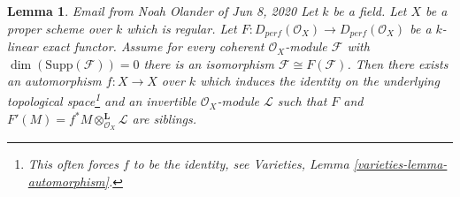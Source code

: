 \documentclass{stacks-project}
\newenvironment{reference}{\comment}{\endcomment}
\theoremstyle{plain}
\newtheorem{lemma}[subsection]{Lemma}
\theoremstyle{definition}
\theoremstyle{remark}
\numberwithin{equation}{subsection}
\begin{document}
\begin{lemma}
\label{lemma-noah}
\begin{reference}
Email from Noah Olander of Jun 8, 2020
\end{reference}
Let $k$ be a field. Let $X$ be a proper scheme over $k$ which is regular.
Let $F : D_{perf}(\mathcal{O}_X) \to D_{perf}(\mathcal{O}_X)$
be a $k$-linear exact functor. Assume for every coherent
$\mathcal{O}_X$-module $\mathcal{F}$ with $\dim(\text{Supp}(\mathcal{F})) = 0$
there is an isomorphism $\mathcal{F} \cong F(\mathcal{F})$.
Then there exists an automorphism $f : X \to X$ over $k$
which induces the identity on the
underlying topological space\footnote{This often forces $f$
to be the identity, see Varieties, Lemma \ref{varieties-lemma-automorphism}.}
and an invertible $\mathcal{O}_X$-module $\mathcal{L}$
such that $F$ and $F'(M) = f^*M \otimes_{\mathcal{O}_X}^\mathbf{L} \mathcal{L}$
are siblings.
\end{lemma}
\end{document}
